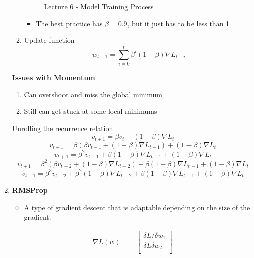 \begin{enumerate}
\begin{enumerate}
\begin{figure}[ht]
    \caption{Lecture 6 - Model Training Process}
    \label{fig:data_split_extended}
\end{figure}
        \begin{itemize}
            \item The best practice has $\beta =0.9$, but it just has to be less than 1
        \end{itemize} 
        \item Update function
        \[
        w_{t+1} = \sum_{i=0}^{t} \beta^i(1-\beta)\nabla L_{t-i}
        \]
    \end{enumerate}
    \textbf{Issues with Momentum}
    \begin{enumerate}
        \item Can overshoot and miss the global minimum
        \item Still can get stuck at some local minimums
    \end{enumerate}
    Unrolling the recurrence relation
    \[
    v_{t+1} = \beta v_t+(1-\beta)\nabla L_t
    \]
    \[
    v_{t+1} = \beta (\beta v_{t-1} +(1-\beta)\nabla L_{t-1})+(1-\beta)\nabla L_t
    \]
    \[
    v_{t+1}=\beta^2v_{t-1}+\beta(1-\beta)\nabla L_{t-1} +(1-\beta)\nabla L_t
    \]
    \[
    v_{t+1}=\beta^2(\beta v_{t-2}+(1-\beta)\nabla L_{t-2})+\beta(1-\beta)\nabla L_{t-1}+(1-\beta)\nabla L_t
    \]
    \[
    v_{t+1}=\beta^3v_{t-2}+\beta^2(1-\beta)\nabla L_{t-2}+\beta(1-\beta)\nabla L_{t-1}+(1-\beta)\nabla L_t
    \]
    \item \textbf{RMSProp}
    \begin{itemize}
        \item A type of gradient descent that is adaptable depending on the size of the gradient.
    \end{itemize}
    \begin{align*}
    \nabla L(w) &= \begin{bmatrix}
           \delta L/\delta w_1    \\
           \delta L\delta w_2    \\

\end{bmatrix}
\end{align*}
\end{enumerate}
